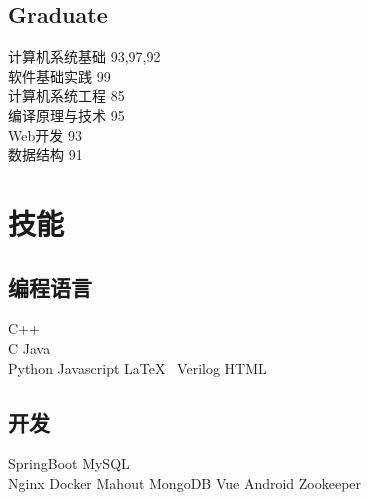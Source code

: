 \documentclass[]{deedy-resume-openfont}
\begin{document}
\begin{minipage}[t]{0.25\textwidth}
\subsection{Graduate}
 计算机系统基础  93,97,92 \\\newline
 软件基础实践 99\\\newline
 计算机系统工程 85 \\\newline
 编译原理与技术 95 \\\newline
 Web开发 93 \\\newline
 数据结构 91 \\\newline
 \sectionsep


\section{技能}
\sectionsep
\subsection{编程语言}
C++ \\
C \textbullet{} Java \\
Python \textbullet{} Javascript \textbullet{} \LaTeX\ \textbullet{} Verilog \textbullet{} HTML \\ 
\sectionsep

\subsection{开发}
SpringBoot  \textbullet{} MySQL \\
Nginx \textbullet{} Docker \textbullet{} Mahout \textbullet{} MongoDB \textbullet{} Vue \textbullet{} Android \textbullet{} Zookeeper \\
\sectionsep


%
%

\end{minipage} 
\hfill
\end{document}
